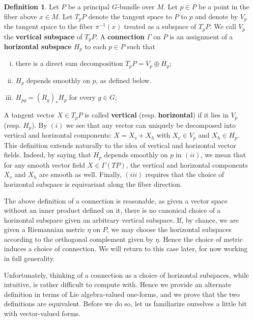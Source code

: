 \documentclass{book}
\theoremstyle{plain}
\theoremstyle{definition}
\newtheorem{defn}{Definition}
\theoremstyle{remark}
\begin{document}

\begin{defn}
    Let $P$ be a principal $G$-bundle over $M$. Let $p\in P$ be a point in the fiber above $x\in M$. Let $T_pP$ denote the tangent space to $P$ to $p$
    and denote by $V_p$ the tangent space to the fiber $\pi^{-1}(x)$ treated as a subspace of $T_pP$. We call $V_p$ the \textbf{vertical subspace} of
    $T_pP$. A \textbf{connection} $\Gamma$ on $P$ is an assignment of a \textbf{horizontal subspace} $H_p$ to each $p\in P$ such that
    \begin{enumerate}[(i)]
        \item there is a direct sum decomposition $T_pP=V_p\oplus H_p;$
        \item $H_p$ depends smoothly on $p$, as defined below.
        \item $H_{pg}=(R_g)_*H_p$ for every $g\in G$;
    \end{enumerate}
    A tangent vector $X\in T_pP$ is called \textbf{vertical} (resp. \textbf{horizontal}) if it lies in $V_p$ (resp. $H_p$). By 
    $(i)$ we see that any vector can uniquely be decomposed into vertical and horizontal components: $X=X_v+X_h$ with
    $X_v\in V_p$ and $X_h\in H_p$. This definition extends naturally to the idea of vertical and horizontal vector fields.
    Indeed, by saying that $H_p$ depends smoothly on $p$ in $(ii)$, we mean that for any smooth vector field $X\in \Gamma(TP)$, the vertical
    and horizontal components $X_v$ and $X_h$ are smooth as well. Finally, $(iii)$ requires that the choice of horizontal subspace is equivariant along the fiber direction.
\end{defn}

The above definition of a connection is reasonable, as given a vector space without an inner product defined on it, there is no canonical choice
of a horizontal subspace given an arbitrary vertical subspace. If, by chance, we are given a Riemannian metric $\eta$ on $P$, we may choose the horizontal
subspaces according to the orthogonal complement given by $\eta$. Hence the choice of metric induces a choice of connection.
We will return to this case later, for now working in full generality.

Unfortunately, thinking of a connection as a choice of horizontal subspaces,
while intuitive, is rather difficult to compute with. Hence we provide an alternate definition in terms of Lie algebra-valued one-forms, and we
prove that the two definitions are equivalent. Before we do so, let us familiarize ourselves a little bit with vector-valued forms.
\end{document}
